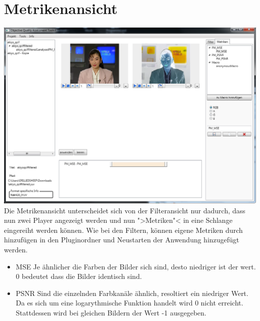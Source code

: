 \chapter{Metrikenansicht}
\includegraphics[scale=0.55]{bilder/Metriken.png}\\[5ex]
Die Metrikenansicht unterscheidet sich von der Filteransicht nur dadurch, dass nun zwei Player angezeigt werden und nun ">Metriken"< in eine Schlange eingereiht werden können.
Wie bei den Filtern, können eigene Metriken durch hinzufügen in den Pluginordner und Neustarten der Anwendung hinzugefügt werden.
\begin{itemize}
\item MSE \newline
Je ähnlicher die Farben der Bilder sich sind, desto niedriger ist der wert. 0 bedeutet dass die Bilder identisch sind.
\item PSNR \newline
Sind die einzelnden Farbkanäle ähnlich, resoltiert ein niedriger Wert. Da es sich um eine logarythmische Funktion handelt wird 0 nicht erreicht. Stattdessen wird bei gleichen Bildern der Wert -1 ausgegeben.
\end{itemize}
